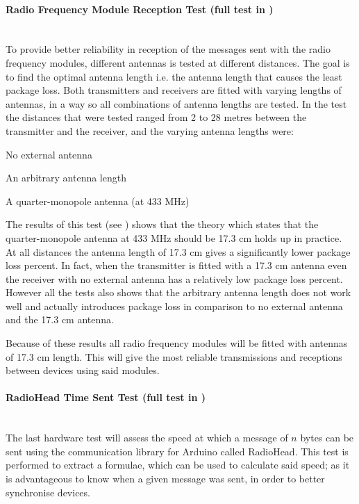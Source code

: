 \paragraph{Radio Frequency Module Reception Test (full test in )} %
\label{par:radio_frequency_module_reception_test}\hfill\\
To provide better reliability in reception of the messages sent with the radio frequency modules, different antennas is tested at different distances.
The goal is to find the optimal antenna length i.e. the antenna length that causes the least package loss.
Both transmitters and receivers are fitted with varying lengths of antennas, in a way so all combinations of antenna lengths are tested. 
In the test the distances that were tested ranged from 2 to 28 metres between the transmitter and the receiver, and the varying antenna lengths were:
\begin{description}[labelindent=\parindent]
    \item[0 cm] No external antenna
    \item[12 cm] An arbitrary antenna length
    \item[17.3 cm] A quarter-monopole antenna (at 433 MHz)
\end{description} 
\noindent
The results of this test (see ) shows that the theory which states that the quarter-monopole antenna at 433 MHz should be 17.3 cm holds up in practice.
At all distances the antenna length of 17.3 cm gives a significantly lower package loss percent.
In fact, when the transmitter is fitted with a 17.3 cm antenna even the receiver with no external antenna has a relatively low package loss percent.
However all the tests also shows that the arbitrary antenna length does not work well and actually introduces package loss in comparison to no external antenna and the 17.3 cm antenna.

Because of these results all radio frequency modules will be fitted with antennas of 17.3 cm length.
This will give the most reliable transmissions and receptions between devices using said modules.

\paragraph{RadioHead Time Sent Test (full test in )} %
\label{par:radiohead_time_sent_test}\hfill\\
The last hardware test will assess the speed at which a message of $n$ bytes can be sent using the communication library for Arduino called RadioHead.
This test is performed to extract a formulae, which can be used to calculate said speed; as it is advantageous to know when a given message was sent, in order to better synchronise devices.   

